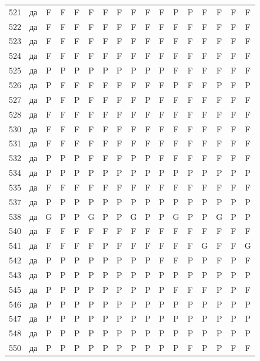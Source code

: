 \begin{table}[p]
\begin{tabular*}{\textwidth}{@{\extracolsep{\fill}}rcccccccccccccccc}
521 & да & F & F & F & F & F & F & F & F & F & P & P & F & F & F & F\\
522 & да & F & F & F & F & F & F & F & F & F & F & F & F & F & F & F\\
523 & да & F & F & F & F & F & F & F & F & F & F & F & F & F & F & F\\
524 & да & F & F & F & F & F & F & F & F & F & F & F & F & F & F & F\\
525 & да & P & P & P & P & P & P & P & P & P & F & F & F & F & F & F\\
526 & да & P & F & F & F & F & F & F & F & F & P & F & F & P & F & P\\
527 & да & P & F & P & F & F & F & F & P & F & F & F & F & F & F & F\\
528 & да & F & F & F & F & F & F & F & F & F & F & F & F & F & F & F\\
530 & да & F & F & F & F & F & F & F & F & F & F & F & F & F & F & F\\
531 & да & F & F & F & F & F & F & F & F & F & F & F & F & F & F & F\\
532 & да & P & P & P & F & F & F & P & P & F & F & F & F & F & F & F\\
534 & да & P & P & P & P & P & P & P & P & P & P & P & P & P & P & P\\
535 & да & F & F & F & F & F & F & F & F & F & F & F & F & F & F & F\\
537 & да & P & P & P & P & P & P & P & P & P & P & P & P & P & P & P\\
538 & да & G & P & P & G & P & P & G & P & P & G & P & P & G & P & P\\
540 & да & F & F & F & F & F & F & F & F & F & F & F & F & F & F & F\\
541 & да & F & F & F & F & P & F & F & F & F & F & F & G & F & F & G\\
542 & да & P & P & P & P & P & P & P & P & F & F & P & P & F & P & F\\
543 & да & P & P & P & P & P & P & P & P & P & P & P & P & P & P & P\\
545 & да & P & P & P & P & P & P & P & P & P & F & F & F & P & P & F\\
546 & да & P & P & P & P & P & P & P & P & P & P & P & P & P & P & P\\
547 & да & P & P & P & P & P & P & P & P & P & P & P & P & P & P & P\\
548 & да & P & P & P & P & P & P & P & P & P & P & P & P & P & P & P\\
550 & да & P & P & P & P & P & P & P & P & P & P & F & P & P & F & F\\
\bottomrule\end{tabular*}\end{table}
\clearpage


